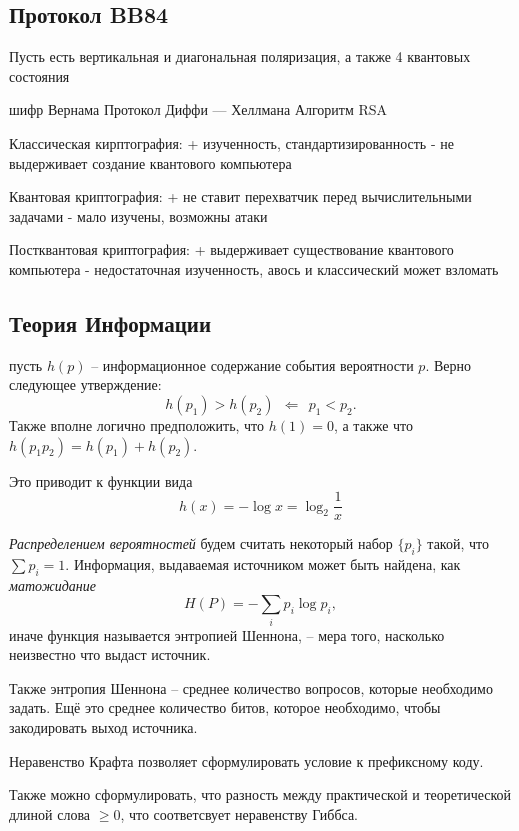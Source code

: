 \subsection{Протокол BB84}
Пусть есть вертикальная и диагональная поляризация, а также 4 квантовых состояния


шифр Вернама
Протокол Диффи — Хеллмана
Алгоритм RSA

Классическая кирптография: 
    + изученность, стандартизированность
    - не выдерживает создание квантового компьютера

Квантовая криптография:
    + не ставит перехватчик перед вычислительными задачами
    - мало изучены, возможны атаки

Постквантовая криптография:
    + выдерживает существование квантового компьютера
    - недостаточная изученность, авось и классический может взломать


\subsection{Теория Информации}    
пусть $h(p)$ -- информационное содержание события вероятности $p$.
Верно следующее утверждение:
\begin{equation*}
    h(p_1) > h(p_2) \ \ \Leftarrow \ \ p_1 < p_2.
\end{equation*}
Также вполне логично предположить, что $h(1) = 0$, а также что $h(p_1 p_2) = h(p_1)+h(p_2)$. 

Это приводит к функции вида
\begin{equation*}
    h(x) = - \log x = \log_2 \frac{1}{x}
\end{equation*}

\textit{Распределением вероятностей} будем считать некоторый набор $\{p_i\}$ такой, что $\sum p_i = 1$.
Информация, выдаваемая источником может быть найдена, как \textit{матожидание} 
\begin{equation*}
    H(P) = - \sum_i p_i \log p_i,
\end{equation*}
иначе функция называется энтропией Шеннона, -- мера того, насколько неизвестно что выдаст источник. 

Также энтропия Шеннона -- среднее количество вопросов, которые необходимо задать. Ещё это среднее количество битов, которое необходимо, чтобы закодировать выход источника. 

Неравенство Крафта позволяет сформулировать условие к префиксному коду. 

Также можно сформулировать, что разность между практической и теоретической длиной слова $\geq 0$, что соответсвует неравенству Гиббса. 


